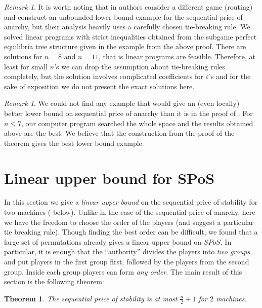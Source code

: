 \documentclass[12pt,a4paper]{article}
\newcommand{\pp}[1]{\todo[color=blue!40!white]{\scriptsize Pao: #1}}
\newtheorem{theorem}[lemma]{Theorem}
\theoremstyle{definition}
\theoremstyle{remark}
\newtheorem{remark}[lemma]{Remark}
\renewcommand{\epsilon}{\varepsilon}
\begin{document}
\begin{remark}\label{rem:tie-breaking}
It is worth noting that in \cite{SPOAcongestion} authors consider a different game (routing) and construct an unbounded lower bound example for the sequential price of anarchy, but their analysis heavily uses a carefully chosen tie-breaking rule. We solved linear programs with strict inequalities obtained from the subgame perfect equilibria tree structure given in the example from the above proof. There are solutions for $n=8$ and $n=11$, that is linear programs are feasible. Therefore, at least for small $n$'s we can drop the assumption about tie-breaking rules completely, but the solution involves complicated coefficients for $\epsilon$'s and for the sake of exposition we do not present the exact solutions here. %
\end{remark}


\begin{remark}
We could not find any example that would give an (even locally) better lower bound on sequential price of anarchy than it is in the proof of . For $n\leq 7$, our computer program searched the whole space and the results obtained above are the best. We believe that the construction from the proof of the theorem gives the best lower bound example. 
\end{remark}

\section{Linear upper bound for SPoS}\label{sec:linear_upper_bound}

In this section we give a \emph{linear upper bound} on the  sequential price of stability for two machines ( below). Unlike in the case of the sequential price of anarchy, here we have the freedom to  choose the order of the players (and suggest a particular tie breaking rule). Though finding the best order can be difficult, we found that a large set of permutations already gives a linear upper bound on $SPoS$. In particular, it is enough that the ``authority'' divides the players into \emph{two groups} and put players in the first group first, followed by the players from the second group. Inside each group players can form \emph{any order}. The main result of this section is the following theorem:

\begin{theorem}\label{th:SPoS}
The sequential price of stability is at most $\frac{n}{2}+1$ for $2$ machines. 
\end{theorem}
\end{document}
